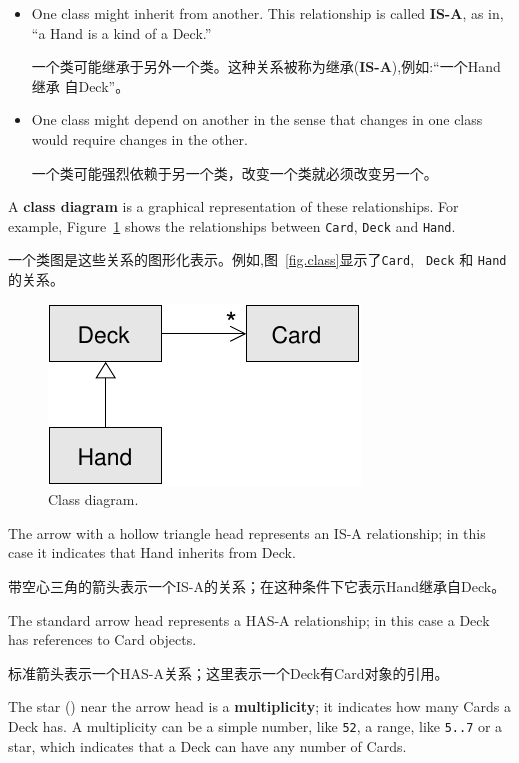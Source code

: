 \documentclass[10pt]{book}
\begin{document}
\begin{CJK}{UTF8}{gbsn}
\begin{itemize}
\item One class might inherit from another.  This relationship
is called {\bf IS-A}, as in, ``a Hand is a kind of a Deck.''

一个类可能继承于另外一个类。这种关系被称为继承({\bf IS-A}),例如:``一个Hand继承
自Deck''。

\item One class might depend on another in the sense that changes
in one class would require changes in the other.

一个类可能强烈依赖于另一个类，改变一个类就必须改变另一个。

\end{itemize}

A {\bf class diagram} is a graphical representation of these
relationships.  For example, Figure~\ref{fig.class1} shows the
relationships between {\tt Card}, {\tt Deck} and {\tt Hand}.

一个类图是这些关系的图形化表示。例如,图~\ref{fig.class}显示了{\tt Card}, {\tt
Deck} 和 {\tt Hand}的关系。

\begin{figure}
\centerline
{\includegraphics[scale=0.8]{figs/class1.pdf}}
\caption{Class diagram.}
\label{fig.class1}
\end{figure}


The arrow with a hollow triangle head represents an IS-A
relationship; in this case it indicates that Hand inherits
from Deck.

带空心三角的箭头表示一个IS-A的关系；在这种条件下它表示Hand继承自Deck。

The standard arrow head represents a HAS-A
relationship; in this case a Deck has references to Card
objects.

标准箭头表示一个HAS-A关系；这里表示一个Deck有Card对象的引用。

The star ({\tt *}) near the arrow head is a 
{\bf multiplicity}; it indicates how many Cards a Deck has.
A multiplicity can be a simple number, like {\tt 52}, a range,
like {\tt 5..7} or a star, which indicates that a Deck can
have any number of Cards.


\end{CJK}
\end{document}
